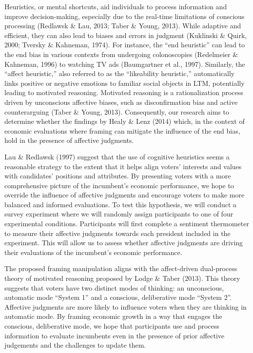 \documentclass[
]{article}
\begin{document}
Heuristics, or mental shortcuts, aid individuals to process information
and improve decision-making, especially due to the real-time limitations
of conscious processing (Redlawsk \& Lau, 2013; Taber \& Young, 2013).
While adaptive and efficient, they can also lead to biases and errors in
judgment (Kuklinski \& Quirk, 2000; Tversky \& Kahneman, 1974). For
instance, the ``end heuristic'' can lead to the end bias in various
contexts from undergoing colonoscopies (Redelmeier \& Kahneman, 1996) to
watching TV ads (Baumgartner et al., 1997). Similarly, the ``affect
heuristic,'' also referred to as the ``likeability heuristic,''
automatically links positive or negative emotions to familiar social
objects in LTM, potentially leading to motivated reasoning. Motivated
reasoning is a rationalization process driven by unconscious affective
biases, such as disconfirmation bias and active counterarguing (Taber \&
Young, 2013). Consequently, our research aims to determine whether the
findings by Healy \& Lenz (2014) which, in the context of economic
evaluations where framing can mitigate the influence of the end bias,
hold in the presence of affective judgments.

Lau \& Redlawsk (1997) suggest that the use of cognitive heuristics
seems a reasonable strategy to the extent that it helps align voters'
interests and values with candidates' positions and attributes. By
presenting voters with a more comprehensive picture of the incumbent's
economic performance, we hope to override the influence of affective
judgments and encourage voters to make more balanced and informed
evaluations. To test this hypothesis, we will conduct a survey
experiment where we will randomly assign participants to one of four
experimental conditions. Participants will first complete a sentiment
thermometer to measure their affective judgments towards each president
included in the experiment. This will allow us to assess whether
affective judgments are driving their evaluations of the incumbent's
economic performance.

The proposed framing manipulation aligns with the affect-driven
dual-process theory of motivated reasoning proposed by Lodge \& Taber
(2013). This theory suggests that voters have two distinct modes of
thinking: an unconscious, automatic mode ``System 1'' and a conscious,
deliberative mode ``System 2''. Affective judgments are more likely to
influence voters when they are thinking in automatic mode. By framing
economic growth in a way that engages the conscious, deliberative mode,
we hope that participants use and process information to evaluate
incumbents even in the presence of prior affective judgements and the
challenges to update them.
\end{document}
